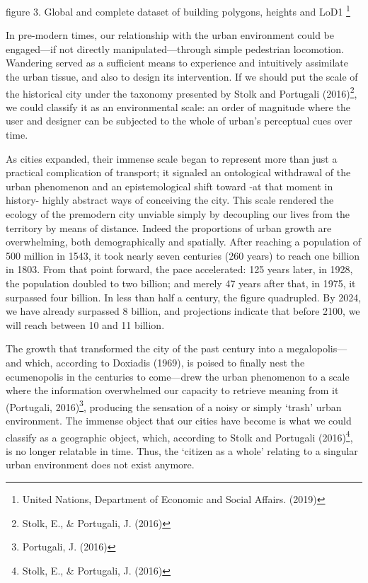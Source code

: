 \documentclass[
  letterpaper,
  DIV=11,
  numbers=noendperiod]{scrreprt}
\begin{document}
figure 3. Global and complete dataset of building polygons, heights and
LoD1 \footnote{United Nations, Department of Economic and Social
  Affairs. (2019)}

In pre-modern times, our relationship with the urban environment could
be engaged---if not directly manipulated---through simple pedestrian
locomotion. Wandering served as a sufficient means to experience and
intuitively assimilate the urban tissue, and also to design its
intervention. If we should put the scale of the historical city under
the taxonomy presented by Stolk and Portugali (2016)\footnote{Stolk, E.,
  \& Portugali, J. (2016)}, we could classify it as an environmental
scale: an order of magnitude where the user and designer can be
subjected to the whole of urban's perceptual cues over time.

As cities expanded, their immense scale began to represent more than
just a practical complication of transport; it signaled an ontological
withdrawal of the urban phenomenon and an epistemological shift toward
-at that moment in history- highly abstract ways of conceiving the city.
This scale rendered the ecology of the premodern city unviable simply by
decoupling our lives from the territory by means of distance. Indeed the
proportions of urban growth are overwhelming, both demographically and
spatially. After reaching a population of 500 million in 1543, it took
nearly seven centuries (260 years) to reach one billion in 1803. From
that point forward, the pace accelerated: 125 years later, in 1928, the
population doubled to two billion; and merely 47 years after that, in
1975, it surpassed four billion. In less than half a century, the figure
quadrupled. By 2024, we have already surpassed 8 billion, and
projections indicate that before 2100, we will reach between 10 and 11
billion.

The growth that transformed the city of the past century into a
megalopolis---and which, according to Doxiadis (1969), is poised to
finally nest the ecumenopolis in the centuries to come---drew the urban
phenomenon to a scale where the information overwhelmed our capacity to
retrieve meaning from it (Portugali, 2016)\footnote{Portugali, J. (2016)},
producing the sensation of a noisy or simply `trash' urban environment.
The immense object that our cities have become is what we could classify
as a geographic object, which, according to Stolk and Portugali
(2016)\footnote{Stolk, E., \& Portugali, J. (2016)}, is no longer
relatable in time. Thus, the `citizen as a whole' relating to a singular
urban environment does not exist anymore.
\end{document}
